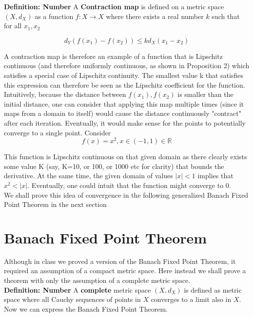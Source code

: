 \documentclass{article}
\begin{document}
\textbf{Definition: Number} A \textbf{Contraction map} is defined on a metric space $(X, d_X)$ as a function $f: X \to X$ where there exists a real number $k$ such that for all $x_1, x_2$

$$d_Y(f(x_1)-f(x_2)) \leq kd_X(x_1-x_2)$$

A contraction map is therefore an example of a function that is Lipschitz continuous (and therefore uniformly continuous, as shown in Proposition 2) which satisfies a special case of Lipschitz continuity. The smallest value k that satisfies this expression can therefore be seen as the Lipschitz coefficient for the function. \\

Intuitively, because the distance between $f(x_1), f(x_2)$ is smaller than the initial distance, one can consider that applying this map multiple times (since it maps from a domain to itself) would cause the distance continuously "contract" after each iteration. Eventually, it would make sense for the points to potentially converge to a single point. Consider 
$$f(x) = x^2, x \in (-1,1) \in \mathbb{R}$$

This function is Lipschitz continuous on that given domain as there clearly exists some value K (say, K=10, or 100, or 1000 etc for clarity) that bounds the derivative. At the same time, the given domain of values $|x| < 1$ implies that $x^2 < |x|$. Eventually, one could intuit that the function might converge to 0. \\

We shall prove this idea of convergence in the following generalized Banach Fixed Point Theorem in the next section\\ 

\section{Banach Fixed Point Theorem}

Although in class we proved a version of the Banach Fixed Point Theorem, it required an assumption of a compact metric space. Here instead we shall prove a theorem with only the assumption of a complete metric space. \\

\textbf{Definition: Number} A \textbf{complete} metric space $(X, d_X)$ is defined as metric space where all Cauchy sequences of points in $X$ converges to a limit also in $X$. \\

Now we can express the Banach Fixed Point Theorem.\\
\end{document}
